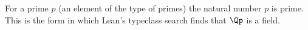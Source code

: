 For a prime $p$ (an element of the type of primes) the natural number $p$ is prime. This is the form in which Lean's typeclass search finds that $\Qp$ is a field.
